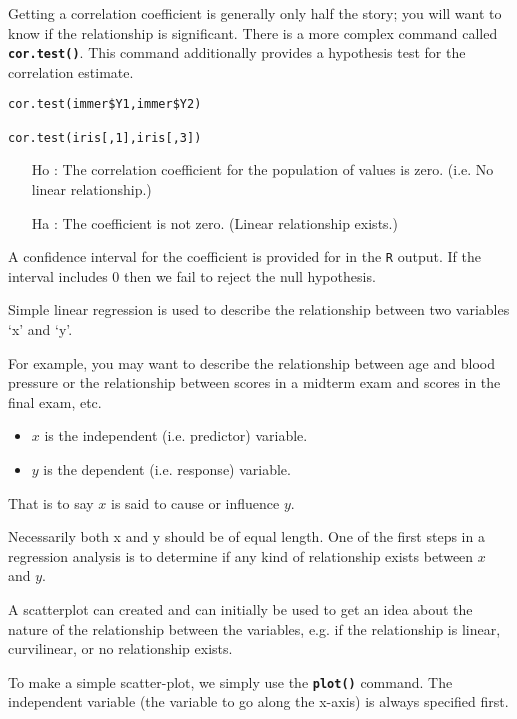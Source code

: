 \documentclass[a4paper,12pt]{article}
\begin{document}
Getting a correlation coefficient is generally only half the story; you will want to know if the relationship is significant. There is a more complex command called \texttt{\textbf{cor.test()}}. This command additionally provides a hypothesis test for the correlation estimate.

\begin{framed}
\begin{verbatim}
cor.test(immer$Y1,immer$Y2)

cor.test(iris[,1],iris[,3])
\end{verbatim}
\end{framed}

\begin{itemize}
\item[Ho] : The correlation coefficient for the population of values is zero. (i.e. No linear relationship.)
\item[Ha]: The coefficient is not zero. (Linear relationship exists.)
\end{itemize}	


A confidence interval for the coefficient is provided for in the \texttt{R} output. If the interval includes 0 then we fail to reject the null hypothesis.

Simple linear regression is used to describe the relationship between two variables ‘x’ and ‘y’.

For example, you may want to describe the relationship between age and blood pressure or the relationship between scores in a midterm exam and scores in the final exam, etc.

\begin{itemize}
\item	$x$ is the independent (i.e. predictor) variable.
\item	$y$ is the dependent (i.e. response) variable.
\end{itemize}
That is to say $x$ is said to cause or influence $y$.

Necessarily both x and y should be of equal length. One of the first steps in a regression analysis is to determine if any kind of relationship exists between $x$ and $y$.

A scatterplot can created and can initially be used to get an idea about the nature of the relationship between the variables, e.g. if the relationship is linear, curvilinear, or no relationship exists.

To make a simple scatter-plot, we simply use the \texttt{\textbf{plot()}} command. The independent variable (the variable to go along the x-axis) is always specified first.
\end{document}
